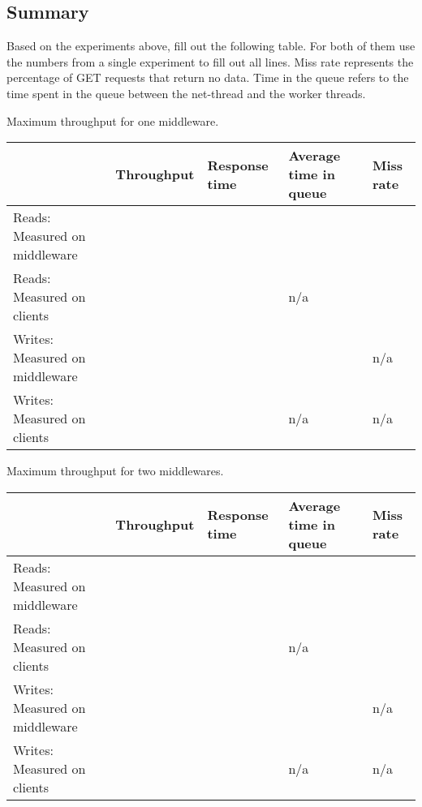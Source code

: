 \documentclass[11pt,a4paper]{article}
\begin{document}
\subsection{Summary}

Based on the experiments above, fill out the following table. For both of them use the numbers from a single experiment to fill out all lines. Miss rate represents the percentage of GET requests that return no data. Time in the queue refers to the time spent in the queue between the net-thread and the worker threads.


\begin{center}
	{Maximum throughput for one middleware.}
	\begin{tabular}{|l|p{2cm}|p{2cm}|p{2cm}|p{2cm}|}
		\hline                                & Throughput & Response time & Average time in queue & Miss rate \\ 
		\hline Reads: Measured on middleware  &            &               &                       &           \\ 
		\hline Reads: Measured on clients     &            &               & n/a                   &           \\ 
		\hline Writes: Measured on middleware &            &               &                       & n/a       \\ 
		\hline Writes: Measured on clients    &            &               & n/a                   & n/a       \\ 
		\hline 
	\end{tabular}
\end{center}

\begin{center}
	{Maximum throughput for two middlewares.}
	\begin{tabular}{|l|p{2cm}|p{2cm}|p{2cm}|p{2cm}|}
		\hline                                & Throughput & Response time & Average time in queue & Miss rate \\ 
		\hline Reads: Measured on middleware  &            &               &                       &           \\ 
		\hline Reads: Measured on clients     &            &               & n/a                   &           \\ 
		\hline Writes: Measured on middleware &            &               &                       & n/a       \\ 
		\hline Writes: Measured on clients    &            &               & n/a                   & n/a       \\ 
		\hline 
	\end{tabular}
\end{center}
\end{document}
